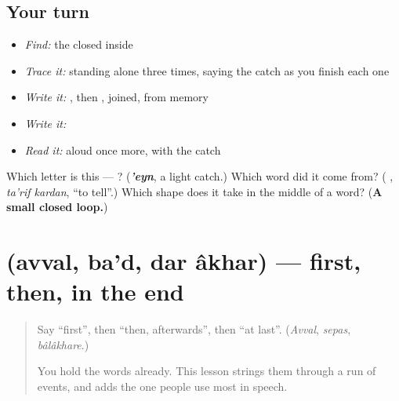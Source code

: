 \subsection*{Your turn}
\begin{itemize}
\raggedright
  \item \emph{Find:} the closed  inside \textbf{}
  \item \emph{Trace it:}  standing alone three times, saying the catch as you finish each one
  \item \emph{Write it:} , then , joined, from memory
  \item \emph{Write it:} \textbf{}
  \item \emph{Read it:} \textbf{ } aloud once more, with the catch
\end{itemize}

\begin{tcolorbox}[breakable,colback=teal!4,colframe=teal!35!black,title={Before you move on}]
Which letter is this — ? (\emph{\textbf{'eyn}}, a light catch.) Which word did it come from? (\textbf{ }, \emph{ta'rif kardan}, \textquotedblleft{}to tell\textquotedblright{}.) Which shape does it take in the middle of a word? (\textbf{A small closed loop.})
\end{tcolorbox}
\section[\texorpdfstring{\fa{اول،} \fa{بعد،} \fa{در} \fa{آخر} (avval, ba'd, dar …)}{اول، بعد، در آخر (avval, ba'd, dar …)}]{    (avval, ba'd, dar âkhar) — first, then, in the end}

\label{lesson:FA-C291-avval-bad}



\begin{quote}
Say \textquotedblleft{}first\textquotedblright{}, then \textquotedblleft{}then, afterwards\textquotedblright{}, then \textquotedblleft{}at last\textquotedblright{}. (\emph{Avval}, \emph{sepas}, \emph{bâlâkhare}.)

You hold the words already. This lesson strings them through a run of events, and adds the one people use most in speech.
\end{quote}

